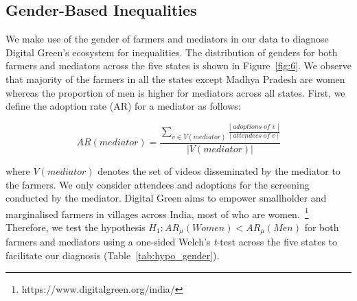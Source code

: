 \documentclass[manuscript,screen]{acmart}
\begin{document}
\subsection{Gender-Based Inequalities}\label{gender_inequalities}

We make use of the gender of farmers and mediators in our data to diagnose Digital Green's ecosystem for inequalities. The distribution of genders for both farmers and mediators across the five states is shown in Figure~\ref{fig:6}. We observe that majority of the farmers in all the states except Madhya Pradesh are women whereas the proportion of men is higher for mediators across all states. First, we define the adoption rate (AR) for a mediator as follows:

\begin{equation}
AR(mediator) = \frac{\sum_{v \in V(mediator)} \frac{|\;adoptions\;of\;v\;|}{|\;attendees\;of\;v\;|}}{| V (mediator) |}
\end{equation}

where $V(mediator)$ denotes the set of videos disseminated by the mediator to the farmers. We only consider attendees and adoptions for the screening conducted by the mediator. Digital Green aims to empower smallholder and marginalised farmers in villages across India, most of who are women.~\footnote{https://www.digitalgreen.org/india/} Therefore, we test the hypothesis $H_{1}: AR_{\mu}(Women) < AR_{\mu}(Men) $ for both farmers and mediators using a one-sided Welch’s \textit{t}-test across the five states to facilitate our diagnosis (Table~\ref{tab:hypo_gender}). 
\end{document}
